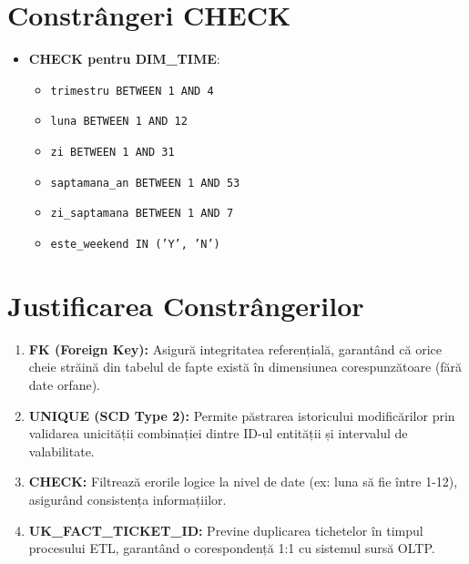 \section{Constrângeri CHECK}

\begin{itemize}
    \item \textbf{CHECK pentru DIM\_TIME}:
    \begin{itemize}
        \item \texttt{trimestru BETWEEN 1 AND 4}
        \item \texttt{luna BETWEEN 1 AND 12}
        \item \texttt{zi BETWEEN 1 AND 31}
        \item \texttt{saptamana\_an BETWEEN 1 AND 53}
        \item \texttt{zi\_saptamana BETWEEN 1 AND 7}
        \item \texttt{este\_weekend IN ('Y', 'N')}
    \end{itemize}
\end{itemize}

\section{Justificarea Constrângerilor}

\begin{enumerate}
    \item \textbf{FK (Foreign Key):} Asigură integritatea referențială, garantând că orice cheie străină din tabelul de fapte există în dimensiunea corespunzătoare (fără date orfane).
    \item \textbf{UNIQUE (SCD Type 2):} Permite păstrarea istoricului modificărilor prin validarea unicității combinației dintre ID-ul entității și intervalul de valabilitate.
    \item \textbf{CHECK:} Filtrează erorile logice la nivel de date (ex: luna să fie între 1-12), asigurând consistența informațiilor.
    \item \textbf{UK\_FACT\_TICKET\_ID:} Previne duplicarea tichetelor în timpul procesului ETL, garantând o corespondență 1:1 cu sistemul sursă OLTP.
\end{enumerate}
